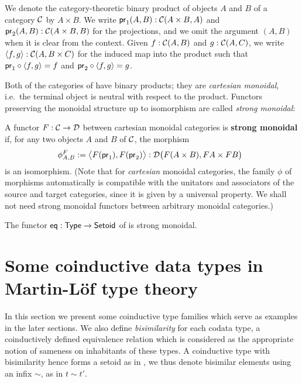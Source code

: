 \documentclass{amsart}
\newcommand{\fat}[1]{\textbf{#1}}
\begin{document}
\begin{remark}
  We denote the category-theoretic binary product of objects $A$ and $B$ of a category $\C$ by $A\times B$.
  We write $\pr_1(A,B) : \C(A\times B, A)$ and $\pr_2(A,B) :\C(A\times B, B)$ for the projections, and we omit the 
  argument $(A,B)$ when it is clear from the context.
  Given $f : \C(A, B)$ and $g : \C(A,C)$, we write $\langle f,g\rangle : \C(A,B\times C)$ for the induced map into the product such that
  $\comp{\langle f,g\rangle}{\pr_1} = f$ and $\comp{\langle f,g\rangle}{\pr_2} = g$.
\end{remark}

Both of the categories of  have binary products; they are \emph{cartesian monoidal}, i.e.\ the terminal 
object is neutral with respect to the product. Functors preserving the monoidal structure up to isomorphism
are called \emph{strong monoidal}:

\begin{definition}\label{def:monoidal_functor}
 A functor $F:\C\to\D$ between cartesian monoidal categories is \fat{strong monoidal} if, for any two objects $A$ and $B$ of $\C$,
  the morphism
 \[ \phi^F_{A,B} := \bigl\langle F(\pr_1), F(\pr_2) \bigr\rangle : \D\bigl(F(A\times B), FA\times FB\bigr)\enspace  \] 
 is an isomorphism.
 (Note that for \emph{cartesian} monoidal categories, the family $\phi$ of morphisms automatically 
  is compatible with the unitators and associators of the source and target categories, 
  since it is given by a universal property. 
  We shall not need strong monoidal functors between arbitrary monoidal categories.)
\end{definition}

\begin{example}
  The functor $\eq: \Set \to \Setoid$ of  is strong monoidal.
\end{example}


\section{Some coinductive data types in Martin-L\"of type theory}\label{sec:tri}

In this section we present some coinductive type families which serve as examples in the later sections.
We also define \emph{bisimilarity} for each codata type, a coinductively defined equivalence relation which is considered 
as the appropriate notion of sameness on inhabitants of these types.
A coinductive type with bisimilarity hence forms a setoid as in , 
we thus denote bisimilar elements using an infix $\sim$, as in $t \sim t'$. 
\end{document}
